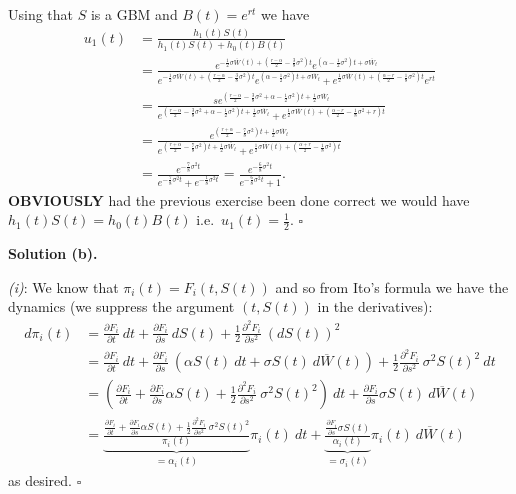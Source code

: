 \documentclass[a4paper,12pt,openany]{book}
\begin{document}
Using that \(S\) is a GBM and \(B(t)=e^{rt}\) we have
\begin{align*}
u_1(t)&=\frac{h_1(t)S(t)}{h_1(t)S(t)+h_0(t)B(t)}\\
&=\frac{e^{-\frac{1}{2}\sigma\overline{W}(t)+\left(\frac{r-\alpha}{2}-\frac{3}{8}\sigma^2\right)t}e^{\left(\alpha-\frac{1}{2}\sigma^2\right)t+\sigma \overline{W}_t}}{e^{-\frac{1}{2}\sigma\overline{W}(t)+\left(\frac{r-\alpha}{2}-\frac{3}{8}\sigma^2\right)t}e^{\left(\alpha-\frac{1}{2}\sigma^2\right)t+\sigma \overline{W}_t}+e^{\frac{1}{2}\sigma\overline{W}(t)+\left(\frac{\alpha - r}{2}-\frac{1}{8}\sigma^2\right)t}e^{rt}}\\
&=\frac{se^{\left(\frac{r-\alpha}{2}-\frac{3}{8}\sigma^2+\alpha-\frac{1}{2}\sigma^2\right)t+\frac{1}{2}\sigma \overline{W}_t}}{e^{\left(\frac{r-\alpha}{2}-\frac{3}{8}\sigma^2+\alpha-\frac{1}{2}\sigma^2\right)t+\frac{1}{2}\sigma \overline{W}_t}+e^{\frac{1}{2}\sigma\overline{W}(t)+\left(\frac{\alpha - r}{2}-\frac{1}{8}\sigma^2+r\right)t}}\\
&=\frac{e^{\left(\frac{r+\alpha}{2}-\frac{7}{8}\sigma^2\right)t+\frac{1}{2}\sigma \overline{W}_t}}{e^{\left(\frac{r+\alpha}{2}-\frac{7}{8}\sigma^2\right)t+\frac{1}{2}\sigma \overline{W}_t}+e^{\frac{1}{2}\sigma\overline{W}(t)+\left(\frac{\alpha + r}{2}-\frac{1}{8}\sigma^2\right)t}}\\
&=\frac{e^{-\frac{7}{8}\sigma^2t}}{e^{-\frac{7}{8}\sigma^2t}+e^{-\frac{1}{8}\sigma^2t}}=\frac{e^{-\frac{6}{8}\sigma^2t}}{e^{-\frac{6}{8}\sigma^2t}+1}.
\end{align*}
\textbf{OBVIOUSLY} had the previous exercise been done correct we would have \(h_1(t)S(t)=h_0(t)B(t)\) i.e.~\(u_1(t)=\frac{1}{2}\). \(\square\)

\noindent\makebox[\linewidth]{\rule{\textwidth}{0.4pt}}

\textbf{Solution (b).}

\emph{(i)}: We know that \(\pi_i(t)=F_i(t,S(t))\) and so from Ito's formula we have the dynamics (we suppress the argument \((t,S(t))\) in the derivatives):
\begin{align*}
d\pi_i(t)&=\frac{\partial F_i}{\partial t}\ dt+\frac{\partial F_i}{\partial s}\ dS(t)+\frac{1}{2}\frac{\partial^2 F_i}{\partial s^2}\ (dS(t))^2\\
&=\frac{\partial F_i}{\partial t}\ dt+\frac{\partial F_i}{\partial s}\ (\alpha S(t)\ dt+\sigma S(t)\ d\overline{W}(t))+\frac{1}{2}\frac{\partial^2 F_i}{\partial s^2}\ \sigma^2 S(t)^2\ dt\\
&=\left(\frac{\partial F_i}{\partial t}+\frac{\partial F_i}{\partial s}\alpha S(t)+\frac{1}{2}\frac{\partial^2 F_i}{\partial s^2}\ \sigma^2 S(t)^2\right)\ dt+\frac{\partial F_i}{\partial s}\sigma S(t)\ d\overline{W}(t)\\
&=\underbrace{\frac{\frac{\partial F_i}{\partial t}+\frac{\partial F_i}{\partial s}\alpha S(t)+\frac{1}{2}\frac{\partial^2 F_i}{\partial s^2}\ \sigma^2 S(t)^2}{\pi_i(t)}}_{=\alpha_i(t)}\pi_i(t)\ dt+\underbrace{\frac{\frac{\partial F_i}{\partial s}\sigma S(t)}{\alpha_i(t)}}_{=\sigma_i(t)}\pi_i(t)\ d\overline{W}(t)
\end{align*}
as desired. \(\square\)
\end{document}
